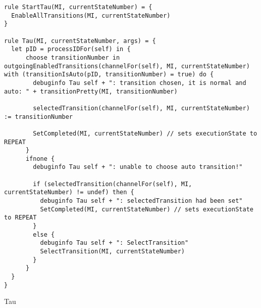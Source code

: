 \begin{listing}[H]
\begin{verbatim}
rule StartTau(MI, currentStateNumber) = {
  EnableAllTransitions(MI, currentStateNumber)
}

rule Tau(MI, currentStateNumber, args) = {
  let pID = processIDFor(self) in {
      choose transitionNumber in outgoingEnabledTransitions(channelFor(self), MI, currentStateNumber) with (transitionIsAuto(pID, transitionNumber) = true) do {
        debuginfo Tau self + ": transition chosen, it is normal and auto: " + transitionPretty(MI, transitionNumber)

        selectedTransition(channelFor(self), MI, currentStateNumber) := transitionNumber

        SetCompleted(MI, currentStateNumber) // sets executionState to REPEAT
      }
      ifnone {
        debuginfo Tau self + ": unable to choose auto transition!"

        if (selectedTransition(channelFor(self), MI, currentStateNumber) != undef) then {
          debuginfo Tau self + ": selectedTransition had been set"
          SetCompleted(MI, currentStateNumber) // sets executionState to REPEAT
        }
        else {
          debuginfo Tau self + ": SelectTransition"
          SelectTransition(MI, currentStateNumber)
        }
      }
  }
}
\end{verbatim}
\caption{Tau}
\label{lst:asm:Tau}
\end{listing}




